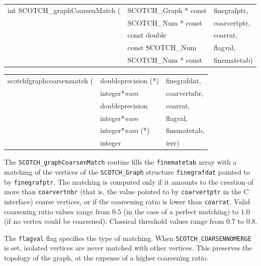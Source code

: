 \begin{itemize}
\progsyn

{\tt\begin{tabular}{l@{}ll}
int SCOTCH\_graphCoarsenMatch ( & SCOTCH\_Graph * const & finegrafptr, \\
                                & SCOTCH\_Num * const   & coarvertptr, \\
                                & const double          & coarrat,     \\
                                & const SCOTCH\_Num     & flagval,     \\
                                & SCOTCH\_Num * const   & finematetab) \\
\end{tabular}}

{\tt\begin{tabular}{l@{}ll}
scotchfgraphcoarsenmatch ( & doubleprecision (*)   & finegrafdat, \\
                           & integer*{\it num}     & coarvertnbr, \\
                           & doubleprecision       & coarrat,     \\
                           & integer*{\it num}     & flagval,     \\
                           & integer*{\it num} (*) & finematetab, \\
                           & integer               & ierr)
\end{tabular}}

\progdes

The {\tt SCOTCH\_graphCoarsenMatch} routine fills the
{\tt fine\lbt mate\lbt tab} array with a matching of the vertices of
the {\tt SCOTCH\_\lbt Graph} structure {\tt fine\lbt graf\lbt dat}
pointed to by {\tt fine\lbt graf\lbt ptr}. The matching is
computed only if it amounts to the creation of more than
{\tt coar\lbt vert\lbt nbr} (that is, the value pointed to by
{\tt coar\lbt vert\lbt ptr} in the C interface) coarse vertices, or if
the coarsening ratio is lower than {\tt coarrat}. Valid coarsening
ratio values range from $0.5$ (in the case of a perfect matching) to
$1.0$ (if no vertex could be coarsened). Classical threshold values
range from $0.7$ to $0.8$.

The {\tt flagval} flag specifies the type of matching.
When {\tt SCOTCH\_\lbt COARSEN\lbt NO\lbt MERGE} is set, isolated
vertices are never matched with other vertices. This preserves the
topology of the graph, at the expense of a higher coarsening ratio.


\end{itemize}
